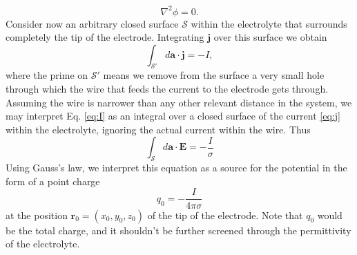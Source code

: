 \documentclass{article}
\begin{document}
\begin{equation}
  \label{eq:laplace}
\nabla^{2} \phi=0.
\end{equation}
Consider now an arbitrary closed surface
$\mathcal S$
within the electrolyte that surrounds completely the tip of the
electrode. Integrating $ \bm j$ over this surface we obtain
\begin{equation}
  \label{eq:I}
\int_{\mathcal S'} d\bm a \cdot \bm j = -I,
\end{equation}
where the prime on $\mathcal S'$ means we remove from the surface a
very small hole through which the wire that feeds the current to the
electrode gets
through. Assuming the wire is narrower than any other relevant
distance in the system, we may interpret Eq. \eqref{eq:I} as an
integral over a closed surface of the current \eqref{eq:j} within the
electrolyte, ignoring the actual current within the wire. Thus
\begin{equation}
  \label{eq:gauss}
  \int_{\mathcal S} d\bm a \cdot \bm E = -\frac{I}{\sigma}
\end{equation}
Using Gauss's law, we interpret this equation as a source for the
potential in the form of a point charge
\begin{equation}
  q_0 = -\frac{I}{4 \pi \sigma}
\end{equation}
at the position $\bm r_0=(x_0, y_0, z_0)$ of the
tip of the electrode. Note that $q_0$ would be the total charge,
and it shouldn't be further screened through the permittivity of the
electrolyte.
\end{document}
